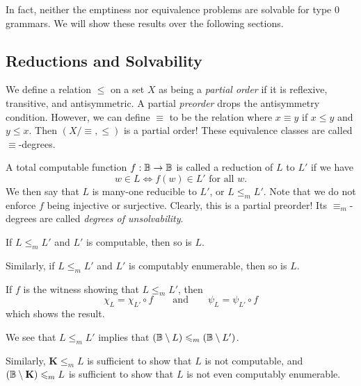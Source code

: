 \documentclass{article}
\begin{document}
In fact, neither the emptiness nor equivalence problems are solvable for type 0 grammars. We will show these results over the following sections.

\subsection{Reductions and Solvability}

\begin{definition}
	We define a relation $\leq$ on a set $X$ as being a \textit{partial order} if it is reflexive, transitive, and antisymmetric. A partial \textit{preorder} drops the antisymmetry condition. However, we can define $\equiv$ to be the relation where $x \equiv y$ if $x \leq y$ and $y \leq x$. Then $(X/\!\!\equiv, \leq)$ is a partial order! These equivalence classes are called $\equiv$-degrees.
\end{definition}

A total computable function $f: \mathbb{B} \to \mathbb{B}$ is called a reduction of $L$ to $L'$ if we have
\[
	w \in L \iff f(w) \in L' \text{ for all $w$.}
\]
We then say that $L$ is many-one reducible to $L'$, or $L \leq_m L'$. Note that we do not enforce $f$ being injective or surjective. Clearly, this is a partial preorder! Its $\equiv_m$-degrees are called \textit{degrees of unsolvability}.

\begin{proposition}
	If $L \leq_m L'$ and $L'$ is computable, then so is $L$.
	    
	Similarly, if $L \leq_m L'$ and $L'$ is computably enumerable, then so is $L$.
\end{proposition}

\begin{prf}
	If $f$ is the witness showing that $L \leq_m L'$, then
	\[
		\chi_L = \chi_{L'} \circ f \qquad \text{and} \qquad \psi_L = \psi_{L'} \circ f
	\] 
	which shows the result.
\end{prf}

\begin{corollary}
	We see that $L \leq_m L'$ implies that $(\mathbb{B} \setminus L) \leqslant_m (\mathbb{B} \setminus L')$.
\end{corollary}

Similarly, $\mathbf{K} \leq_m L$ is sufficient to show that $L$ is not computable, and $(\mathbb{B} \setminus \mathbf{K}) \leqslant_m L$ is sufficient to show that $L$ is not even computably enumerable.
\end{document}
